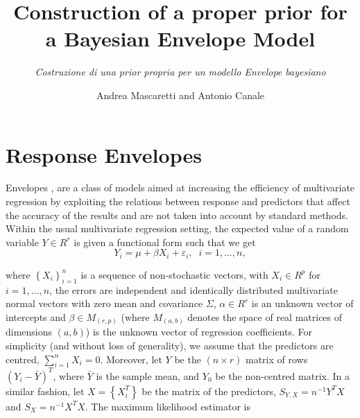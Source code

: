 \documentclass[graybox]{svmult}
\begin{document}
\title*{Construction of a proper prior for a Bayesian Envelope Model}
\subtitle{\emph{Costruzione di una prior propria per un modello Envelope bayesiano}}
\author{Andrea Mascaretti and Antonio Canale}
%
%
\maketitle


\section{Response Envelopes}
\label{sec:1}
Envelopes
\cite{cookENVELOPEMODELSPARSIMONIOUS2010,cookIntroductionEnvelopesDimension2018},
are a class of models aimed at increasing the efficiency of
multivariate regression by exploiting the relations between response
and predictors that affect the accuracy of the results and are not
taken into account by standard methods.  Within the usual multivariate
regression setting, the expected value of a random variable
$Y \in R^r$ is given a functional form such that we get
\begin{equation}
  \label{eq:1}
  Y_i = \mu + \beta X_i + \varepsilon_i, \;\; i = 1, \dots, n,
\end{equation}

where $\left\{X_i\right\}_{i = 1}^n$ is a sequence of non-stochastic
vectors, with $X_i \in R^p$ for $i = 1, \dots, n$, the errors are
independent and identically distributed multivariate normal vectors
with zero mean and covariance $\Sigma$, $\alpha \in R^r$ is an unknown
vector of intercepts and $\beta \in M_{\left( r, p \right)}$ (where
$M_{\left( a, b \right)}$ denotes the space of real matrices of dimensions
$\left( a, b \right)$) is the unknown vector of regression
coefficients.  For simplicity (and without loss of generality), we
assume that the predictors are centred, $\sum_{i = 1}^n X_i =
0$. Moreover, let $Y$ be the $\left( n \times r \right)$ matrix of
rows $\left(Y_i - \bar{Y}\right)^T$, where $\bar{Y}$ is the sample
mean, and $Y_0$ be the non-centred matrix. In a similar fashion, let
$X = \left\{X_i^T\right\}$ be the matrix of the predictors,
$S_{Y, X} = n^{-1} Y^TX$ and $S_X = n^{-1}X^TX$. The maximum
likelihood estimator is
\end{document}
